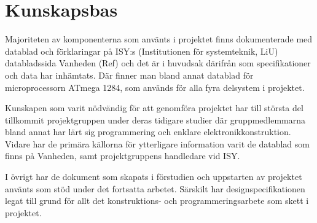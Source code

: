 


\section{Kunskapsbas}

Majoriteten av komponenterna som använts i projektet finns dokumenterade med datablad och förklaringar på ISY:s (Institutionen för systemteknik, LiU) databladssida Vanheden (Ref) och det är i huvudsak därifrån som specifikationer och data har inhämtats. Där finner man bland annat datablad för microprocessorn ATmega 1284, som används för alla fyra delsystem i projektet. 

Kunskapen som varit nödvändig för att genomföra projektet har till största del tillkommit projektgruppen under deras tidigare studier där gruppmedlemmarna bland annat har lärt sig programmering och enklare elektronikkonstruktion. Vidare har de primära källorna för ytterligare information varit de datablad som finns på Vanheden, samt projektgruppens handledare vid ISY. 

I övrigt har de dokument som skapats i förstudien och uppstarten av projektet använts som stöd under det fortsatta arbetet. Särskilt har designspecifikationen legat till grund för allt det konstruktions- och programmeringsarbete som skett i projektet.